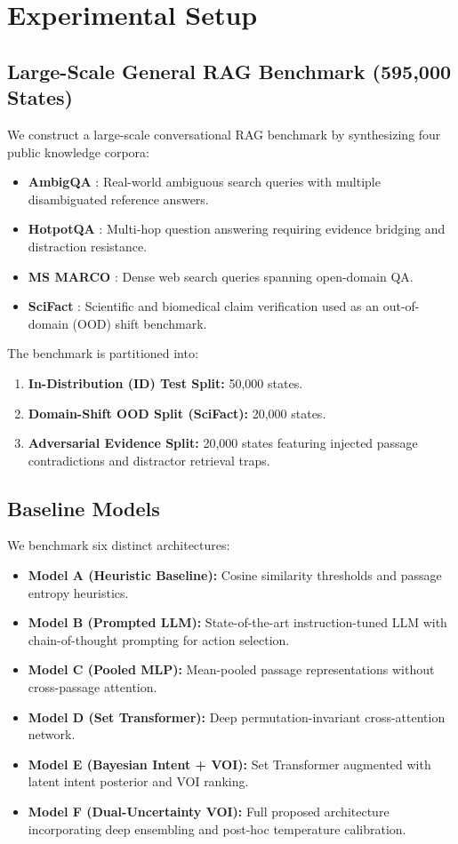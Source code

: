 \section{Experimental Setup}
\label{sec:experimental_setup}

\subsection{Large-Scale General RAG Benchmark (595,000 States)}
We construct a large-scale conversational RAG benchmark by synthesizing four public knowledge corpora:
\begin{itemize}
    \item \textbf{AmbigQA} \cite{min2020ambigqa}: Real-world ambiguous search queries with multiple disambiguated reference answers.
    \item \textbf{HotpotQA} \cite{yang2018hotpotqa}: Multi-hop question answering requiring evidence bridging and distraction resistance.
    \item \textbf{MS MARCO} \cite{bajaj2016ms}: Dense web search queries spanning open-domain QA.
    \item \textbf{SciFact} \cite{wadden2020fact}: Scientific and biomedical claim verification used as an out-of-domain (OOD) shift benchmark.
\end{itemize}

The benchmark is partitioned into:
\begin{enumerate}
    \item \textbf{In-Distribution (ID) Test Split:} 50,000 states.
    \item \textbf{Domain-Shift OOD Split (SciFact):} 20,000 states.
    \item \textbf{Adversarial Evidence Split:} 20,000 states featuring injected passage contradictions and distractor retrieval traps.
\end{enumerate}

\subsection{Baseline Models}
We benchmark six distinct architectures:
\begin{itemize}
    \item \textbf{Model A (Heuristic Baseline):} Cosine similarity thresholds and passage entropy heuristics.
    \item \textbf{Model B (Prompted LLM):} State-of-the-art instruction-tuned LLM with chain-of-thought prompting for action selection.
    \item \textbf{Model C (Pooled MLP):} Mean-pooled passage representations without cross-passage attention.
    \item \textbf{Model D (Set Transformer):} Deep permutation-invariant cross-attention network.
    \item \textbf{Model E (Bayesian Intent + VOI):} Set Transformer augmented with latent intent posterior and VOI ranking.
    \item \textbf{Model F (Dual-Uncertainty VOI):} Full proposed architecture incorporating deep ensembling and post-hoc temperature calibration.
\end{itemize}
